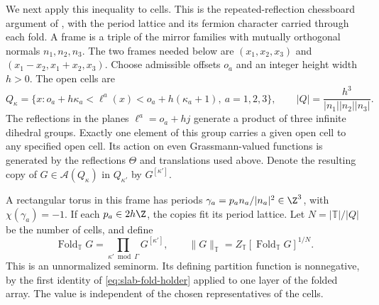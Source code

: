 We next apply this inequality to cells. This is the repeated-reflection
chessboard argument of \cite[Section~4]{FILS1978}, with the period
lattice and its fermion character carried through each fold. A frame is a triple of the
mirror families with mutually orthogonal normals $n_1,n_2,n_3$.
The two frames needed below are $(x_1,x_2,x_3)$ and
$(x_1-x_2,x_1+x_2,x_3)$. Choose admissible offsets $o_a$ and an integer
height width $h>0$. The open cells are
\begin{equation}\label{eq:slab-cells}
 Q_\kappa=\{x:o_a+h\kappa_a<\ell^a(x)
                         <o_a+h(\kappa_a+1),\ a=1,2,3\},
 \qquad |Q|=\frac{h^3}{|n_1||n_2||n_3|}.
\end{equation}
The reflections in the planes $\ell^a=o_a+hj$ generate a product of
three infinite dihedral groups. Exactly one element of this group
carries a given open cell to any specified open cell. Its action on
even Grassmann-valued functions is generated by the reflections
$\Theta$ and translations used above. Denote the resulting copy of
$G\in\mathcal A(Q_\kappa)$ in $Q_{\kappa'}$ by $G^{[\kappa']}$.

A rectangular torus in this frame has periods
$\gamma_a=p_an_a/|n_a|^2\in\Z^3$, with $\chi(\gamma_a)=-1$.
If each $p_a\in2h\Z$, the copies fit its period lattice. Let
$N=|\mathbb T|/|Q|$ be the number of cells, and define
\begin{equation}\label{eq:slab-chessboard-norm}
 \operatorname{Fold}_{\mathbb T}G
          =\prod_{\kappa'\bmod\Gamma}G^{[\kappa']},
 \qquad \|G\|_{\mathbb T}
          =Z_{\mathbb T}[\operatorname{Fold}_{\mathbb T}G]^{1/N}.
\end{equation}
This is an unnormalized seminorm. Its defining partition function is
nonnegative, by the first identity of
\eqref{eq:slab-fold-holder} applied to one layer of the folded array.
The value is independent of the chosen representatives of the cells.

